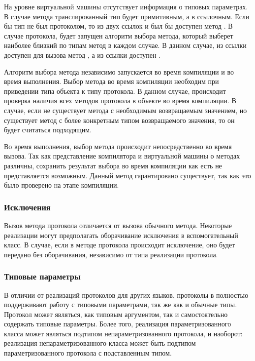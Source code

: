 На уровне виртуальной машины отсутствует информация о типовых параметрах. В случае метода  транслированный тип будет примитивным, а в  ссылочным. Если бы тип  не был протоколом, то из двух ссылок  и  был бы доступен метод . В случае протокола, будет запущен алгоритм выбора метода, который выберет наиболее близкий по типам метод в каждом случае. В данном случае, из ссылки  доступен для вызова метод , а из ссылки  доступен .

Алгоритм выбора метода независимо запускается во время компиляции и во время выполнения. Выбор метода во время компиляции необходим при приведении типа объекта к типу протокола. В данном случае, происходит проверка наличия всех методов протокола в объекте во время компиляции. В случае, если не существует метода с необходимым возвращаемым значением, но существует метод с более конкретным типом возвращаемого значения, то он будет считаться подходящим.

Во время выполнения, выбор метода происходит непосредственно во время вызова. Так как представление компилятора и виртуальной машины о методах различны, сохранить результат выбора во время компиляции как есть не представляется возможным. Данный метод гарантировано существует, так как это было проверено на этапе компиляции.

\subsubsection{Исключения}
Вызов метода протокола отличается от вызова обычного метода. Некоторые реализации могут предполагать оборачивание исключения в вспомогательный класс. В случае, если в методе протокола происходит исключение, оно будет передано без оборачивания, независимо от типа реализации протокола.

\subsubsection{Типовые параметры}
В отличии от реализаций протоколов для других  языков, протоколы в  полностью поддерживают работу с типовыми параметрами, так же как и обычные типы. Протокол может являться, как типовым аргументом, так и самостоятельно содержать типовые параметры. Более того, реализация параметризованного класса может являться подтипом непараметризованного протокола, и наоборот: реализация непараметризованного класса может быть подтипом параметризованного протокола с подставленным типом.

